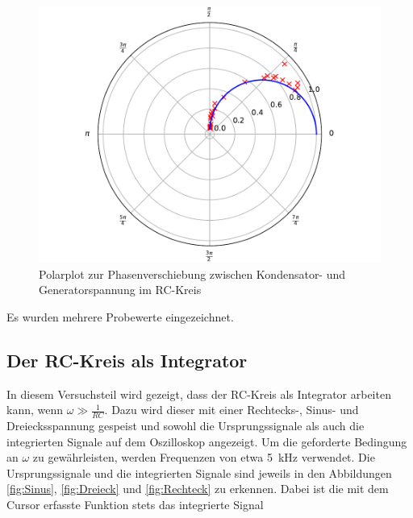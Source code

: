 \begin{figure}
  \centering
  \includegraphics[scale=0.8]{content/plot4.pdf}
  \caption{Polarplot zur Phasenverschiebung zwischen Kondensator- und Generatorspannung im RC-Kreis}
  \label{fig:plot4}
\end{figure}

Es wurden mehrere Probewerte eingezeichnet.

\subsection{Der RC-Kreis als Integrator}

In diesem Versuchsteil wird gezeigt, dass der RC-Kreis als Integrator arbeiten 
kann, wenn $\omega \gg \frac{1}{RC}$. Dazu wird dieser mit einer Rechtecks-, 
Sinus- und Dreiecksspannung gespeist und sowohl die Ursprungssignale als auch 
die integrierten Signale auf dem Oszilloskop angezeigt. Um die geforderte 
Bedingung an $\omega$ zu gewährleisten, werden Frequenzen von etwa \SI{5}{\kilo\hertz}
verwendet. 
Die Ursprungssignale und die integrierten Signale sind jeweils in den Abbildungen 
\ref{fig:Sinus}, \ref{fig:Dreieck} und \ref{fig:Rechteck} zu erkennen. Dabei ist
die mit dem Cursor erfasste Funktion stets das integrierte Signal

